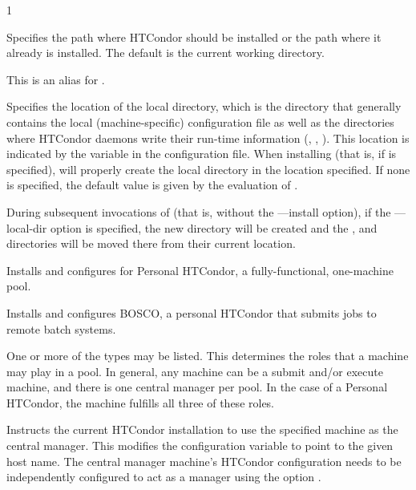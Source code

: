 \begin{ManPage}{\label{man-condor-configure}}{1}
\begin{Options}
   {Specifies the path
    where HTCondor should be installed or the path where it already is
    installed. The default is the current working directory.}

   {This is an alias for
    .}

   {Specifies the
    location of the local directory, which is the directory that generally 
    contains the local (machine-specific) configuration file as well as the
    directories where HTCondor daemons write their run-time information 
    (, , ).
    This location is indicated  by the  
    variable in the configuration file. 
    When installing (that is, if  is specified),
    will properly create the local directory in the location specified.
    If none is specified, the default value is given by the evaluation of
    .

    During subsequent invocations of 
    (that is, without the ---install option),
    if the ---local-dir option is specified, the new directory
    will be created and the ,  and  
    directories will be moved there from their current location.}

   {Installs and configures for 
     Personal HTCondor, a fully-functional, one-machine pool.}

   {Installs and configures BOSCO, a personal
     HTCondor that submits jobs to remote batch systems.}

   {One
    or more of the types may be listed.
    This determines the roles that a machine may play in a pool.
    In general, any machine can be a submit and/or execute machine,
    and there is one central manager per pool.
    In the case of a Personal HTCondor,
    the machine fulfills all three of these roles.}

   {Instructs
    the current HTCondor installation to use the specified machine
    as the central manager. 
    This modifies the configuration variable 
    to point to the given host name.
    The central manager machine's HTCondor configuration needs
    to be independently configured to 
    act as a manager using the option . }


\end{Options}
\end{ManPage}
